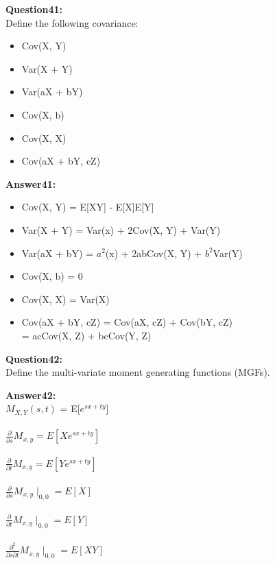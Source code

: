 \documentclass{article}
\begin{document}
\textbf{Question41:} \\
Define the following covariance:
\begin{itemize}
	\item Cov(X, Y)
	\item Var(X + Y)
	\item Var(aX + bY)
	\item Cov(X, b)
	\item Cov(X, X)
	\item Cov(aX + bY, cZ)
\end{itemize}

\textbf{Answer41:}\\
\begin{itemize}
	\item Cov(X, Y) = E[XY] - E[X]E[Y]
	\item Var(X + Y) = Var(x) + 2Cov(X, Y) + Var(Y)
	\item Var(aX + bY) = $a^2$(x) + 2abCov(X, Y) + $b^2$Var(Y)
	\item Cov(X, b) = 0
	\item Cov(X, X) = Var(X)
	\item Cov(aX + bY, cZ) = Cov(aX, cZ) + Cov(bY, cZ)\\
	= acCov(X, Z) + bcCov(Y, Z)
\end{itemize}


\textbf{Question42:} \\
Define the multi-variate moment generating functions (MGFs).

\textbf{Answer42:}\\
$M_{X, Y}(s, t)$ = E[$e^{sx + ty}$]
\\\\
$\frac{\partial}{\partial s} M_{x, y} = E[X e^{sx+ty}]$
\\\\
$\frac{\partial}{\partial t} M_{x, y} = E[Y e^{sx+ty}]$
\\\\
$\frac{\partial}{\partial s} M_{x, y} \mid _{0,0} = E[X]$
\\\\
$\frac{\partial}{\partial t} M_{x, y} \mid _{0,0} = E[Y]$
\\\\
$\frac{\partial^2}{\partial s \partial t} M_{x, y} \mid _{0,0} = E[XY]$
\end{document}
